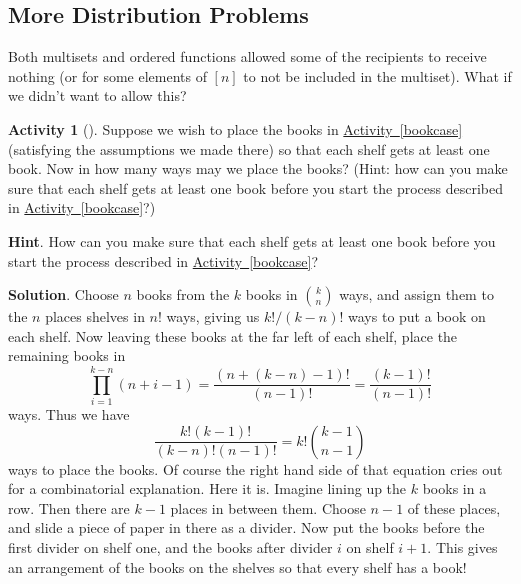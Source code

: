 \documentclass[10pt,]{book}
\theoremstyle{plain}
\theoremstyle{definition}
\theoremstyle{definition}
\theoremstyle{definition}
\newtheorem{activity}[project]{Activity}
\theoremstyle{definition}
\numberwithin{equation}{chapter}
\begin{document}
\subsection[{More Distribution Problems}]{More Distribution Problems}\label{subsec-moredistributions}
\hypertarget{p-759}{}%
Both multisets and ordered functions allowed some of the recipients to receive nothing (or for some elements of \([n]\) to not be included in the multiset).  What if we didn't want to allow this?%
\begin{activity}[]\label{bookcaseeveryshelf}
\hypertarget{p-760}{}%
Suppose we wish to place the books in \hyperref[bookcase]{Activity~\ref{bookcase}} (satisfying the assumptions we made there) so that each shelf gets at least one book. Now in how many ways may we place the books? (Hint: how can you make sure that each shelf gets at least one book before you start the process described in \hyperref[bookcase]{Activity~\ref{bookcase}}?)%
\par\smallskip%
\noindent\textbf{Hint}.\hypertarget{hint-61}{}\quad%
\hypertarget{p-761}{}%
How can you make sure that each shelf gets at least one book before you start the process described in \hyperref[bookcase]{Activity~\ref{bookcase}}?%
\par\smallskip%
\noindent\textbf{Solution}.\hypertarget{solution-70}{}\quad%
\hypertarget{p-762}{}%
Choose \(n\) books from the \(k\) books in \(\binom{k}{n}\) ways, and assign them to the \(n\) places shelves in \(n!\) ways, giving us \(k!/(k-n)!\) ways to put a book on each shelf. Now leaving these books at the far left of each shelf, place the remaining books in%
\begin{equation*}
\prod_{i=1}^{k-n}
(n+i-1)=\frac{(n+(k-n)-1)!}{(n-1)!}=\frac{(k-1)!}{(n-1)!}
\end{equation*}
ways. Thus we have%
\begin{equation*}
\frac{k!(k-1)!}{(k-n)!(n-1)!}=k!\binom{k-1}{n-1}
\end{equation*}
ways to place the books. Of course the right hand side of that equation cries out for a combinatorial explanation. Here it is. Imagine lining up the \(k\) books in a row. Then there are \(k-1\) places in between them. Choose \(n-1\) of these places, and slide a piece of paper in there as a divider. Now put the books before the first divider on shelf one, and the books after divider \(i\) on shelf \(i+1\). This gives an arrangement of the books on the shelves so that every shelf has a book!%
\end{activity}
\hypertarget{p-763}{}%
\end{document}

